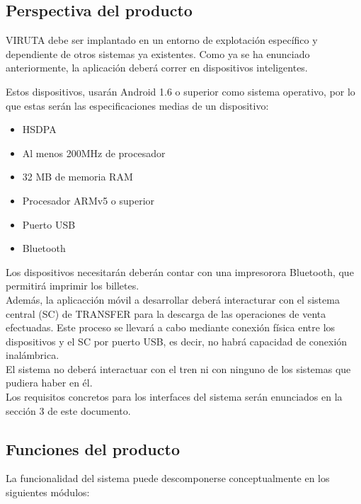 \subsection{Perspectiva del producto}

VIRUTA debe ser implantado en un entorno de explotación específico y dependiente de otros sistemas ya existentes. Como ya se ha enunciado anteriormente, la aplicación deberá correr en dispositivos inteligentes.

Estos dispositivos, usarán Android 1.6 o superior como sistema operativo, por lo que estas serán las especificaciones medias de un dispositivo:

\begin{itemize}
\item HSDPA
\item Al menos 200MHz de procesador
\item 32 MB de memoria RAM
\item Procesador ARMv5 o superior 
\item Puerto USB
\item Bluetooth
\end{itemize}

Los dispositivos necesitarán deberán contar con una impresorora Bluetooth, que permitirá imprimir los billetes.\\

Además, la aplicacción móvil a desarrollar deberá interacturar con el sistema central (SC) de TRANSFER para la descarga de las operaciones de venta efectuadas.   Este proceso se llevará a cabo mediante conexión física entre los dispositivos y el SC por puerto USB, es decir, no habrá capacidad de conexión inalámbrica.\\

El sistema no deberá interactuar con el tren ni con ninguno de los sistemas que pudiera haber en él.\\

Los requisitos concretos para los interfaces del sistema serán enunciados en la sección 3 de este documento.


\subsection{Funciones del producto}

La funcionalidad del sistema puede descomponerse conceptualmente en los siguientes módulos:

